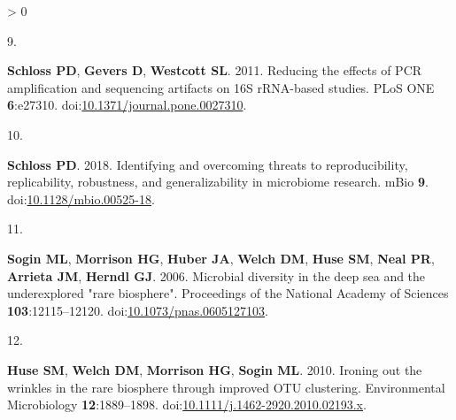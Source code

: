 \documentclass[
]{article}
\newlength{\cslhangindent}
\newlength{\csllabelwidth}
\newenvironment{CSLReferences}[3] %
 {%
  \setlength{\parindent}{0pt}
  \ifodd #1 \everypar{\setlength{\hangindent}{\cslhangindent}}\ignorespaces\fi
  \ifnum #2 > 0
  \setlength{\parskip}{#2\baselineskip}
  \fi
 }%
 {}
\newcommand{\CSLLeftMargin}[1]{\parbox[t]{\csllabelwidth}{#1}}
\newcommand{\CSLRightInline}[1]{\parbox[t]{\linewidth - \csllabelwidth}{#1}}
\begin{document}
\begin{CSLReferences}{0}{0}
{{NR}, \textbf{Chia N}, \textbf{Fierer N}, \textbf{White O}, \textbf{Cani
PD}, \textbf{Gajer P}, \textbf{Strandwitz P}, \textbf{Kashyap P},
\textbf{Dutton R}, \textbf{Park RS}, \textbf{Xavier RJ}, \textbf{Mills
RH}, \textbf{Krajmalnik-Brown R}, \textbf{Ley R}, \textbf{Owens SM},
\textbf{Klemmer S}, \textbf{Matamoros S}, \textbf{Mirarab S},
\textbf{Moorman S}, \textbf{Holmes S}, \textbf{Schwartz T},
\textbf{Eshoo-Anton TW}, \textbf{Vigers T}, \textbf{Pandey V},
\textbf{Treuren WV}, \textbf{Fang X}, \textbf{Xu ZZ}, \textbf{Jarmusch
A}, \textbf{Geier J}, \textbf{Reeve N}, \textbf{Silva R},
\textbf{Kopylova E}, \textbf{Nguyen D}, \textbf{Sanders K},
\textbf{Benitez RAS}, \textbf{Heale AC}, \textbf{Abramson M},
\textbf{Waldispühl J}, \textbf{Butyaev A}, \textbf{Drogaris C},
\textbf{Nazarova E}, \textbf{Ball M}, \textbf{Gunderson B}. 2018.
American gut: An open platform for citizen science microbiome research.
{mSystems} \textbf{3}.
doi:\href{https://doi.org/10.1128/msystems.00031-18}{10.1128/msystems.00031-18}.}

\leavevmode\hypertarget{ref-Schloss2011}{}%
\CSLLeftMargin{9. }
\CSLRightInline{\textbf{Schloss PD}, \textbf{Gevers D}, \textbf{Westcott
SL}. 2011. Reducing the effects of {PCR} amplification and sequencing
artifacts on 16S {rRNA}-based studies. {PLoS} {ONE} \textbf{6}:e27310.
doi:\href{https://doi.org/10.1371/journal.pone.0027310}{10.1371/journal.pone.0027310}.}

\leavevmode\hypertarget{ref-Schloss2018}{}%
\CSLLeftMargin{10. }
\CSLRightInline{\textbf{Schloss PD}. 2018. Identifying and overcoming
threats to reproducibility, replicability, robustness, and
generalizability in microbiome research. {mBio} \textbf{9}.
doi:\href{https://doi.org/10.1128/mbio.00525-18}{10.1128/mbio.00525-18}.}

\leavevmode\hypertarget{ref-Sogin2006}{}%
\CSLLeftMargin{11. }
\CSLRightInline{\textbf{Sogin ML}, \textbf{Morrison HG}, \textbf{Huber
JA}, \textbf{Welch DM}, \textbf{Huse SM}, \textbf{Neal PR},
\textbf{Arrieta JM}, \textbf{Herndl GJ}. 2006. Microbial diversity in
the deep sea and the underexplored "rare biosphere". Proceedings of the
National Academy of Sciences \textbf{103}:12115--12120.
doi:\href{https://doi.org/10.1073/pnas.0605127103}{10.1073/pnas.0605127103}.}

\leavevmode\hypertarget{ref-Huse2010}{}%
\CSLLeftMargin{12. }
\CSLRightInline{\textbf{Huse SM}, \textbf{Welch DM}, \textbf{Morrison
HG}, \textbf{Sogin ML}. 2010. Ironing out the wrinkles in the rare
biosphere through improved {OTU} clustering. Environmental Microbiology
\textbf{12}:1889--1898.
doi:\href{https://doi.org/10.1111/j.1462-2920.2010.02193.x}{10.1111/j.1462-2920.2010.02193.x}.}


\end{CSLReferences}
\end{document}
